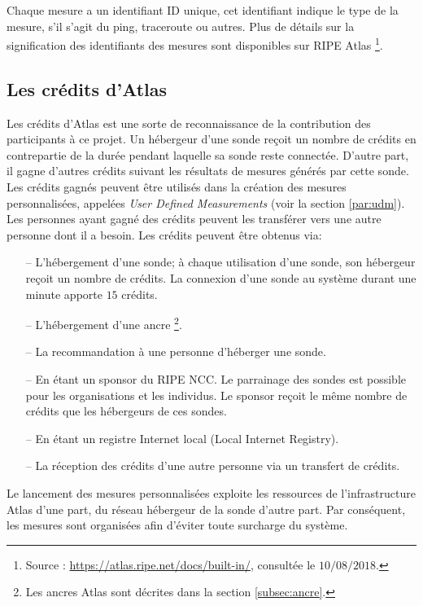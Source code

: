 Chaque mesure a un identifiant ID unique, cet identifiant indique le type de la mesure, s'il s'agit du ping, traceroute ou autres. Plus de détails sur la signification des identifiants des mesures sont disponibles sur RIPE Atlas \footnote{Source : \url{https://atlas.ripe.net/docs/built-in/}, consultée le $10/08/2018$.}.
\subsection{Les crédits d'Atlas} \label{credits-atlas}
Les crédits  d'Atlas est une sorte de reconnaissance de la contribution des participants à ce projet. Un hébergeur d'une sonde   reçoit un nombre de crédits en contrepartie de la durée pendant laquelle sa sonde reste connectée. D'autre part, il gagne d'autres crédits suivant les résultats de mesures générés par cette sonde. Les crédits gagnés peuvent être utilisés dans la création des mesures personnalisées, appelées  \textit{User Defined Measurements} (voir la section \ref{par:udm}). Les personnes ayant gagné des crédits peuvent les transférer vers une autre personne dont il a besoin. Les crédits peuvent être obtenus via:
\begin{itemize}
	\item[--] L'hébergement d'une sonde; à chaque utilisation d'une sonde, son hébergeur reçoit un nombre de crédits.  La connexion d'une sonde   au système durant une minute apporte $15$ crédits.
	\item[--] L'hébergement d'une ancre \footnote{Les ancres Atlas sont décrites dans  la section \ref{subsec:ancre}.}.
	\item[--] La recommandation à une personne d'héberger une sonde.
	\item[--] En étant un sponsor du RIPE NCC. Le parrainage des sondes est possible pour les organisations et les individus.  Le sponsor reçoit le même nombre de crédits que les hébergeurs de ces sondes.
	\item[--] En étant  un  registre Internet local (Local Internet Registry).
	\item[--] La réception des crédits d'une autre personne via un transfert de crédits.
\end{itemize}

Le lancement des mesures personnalisées exploite les ressources de l'infrastructure  Atlas d'une part,  du réseau hébergeur de la sonde d'autre part. Par conséquent, les mesures sont organisées afin d'éviter toute surcharge du système. 

